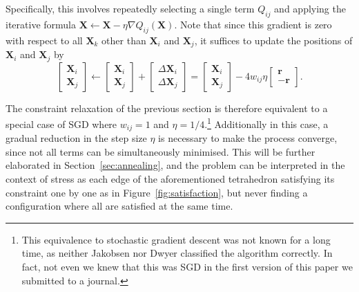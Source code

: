 Specifically, this involves repeatedly selecting a single term $Q_{ij}$ and applying the iterative formula $\mathbf{X}\leftarrow \mathbf{X}-\eta\nabla Q_{ij}(\mathbf{X})$.
Note that since this gradient is zero with respect to all $\mathbf{X}_k$ other than $\mathbf{X}_i$ and $\mathbf{X}_j$, it suffices to update the positions of $\mathbf{X}_i$ and $\mathbf{X}_j$ by
\begin{equation}
  \begin{bmatrix}\mathbf{X}_i\\\mathbf{X}_j\end{bmatrix}
  \leftarrow
  \begin{bmatrix}\mathbf{X}_i\\\mathbf{X}_j\end{bmatrix}+
  \begin{bmatrix}\Delta \mathbf{X}_i\\\Delta \mathbf{X}_j\end{bmatrix}
  =
  \begin{bmatrix}\mathbf{X}_i\\\mathbf{X}_j\end{bmatrix}-
  4w_{ij}\eta
  \begin{bmatrix}\mathbf{r}\\-\mathbf{r}\end{bmatrix}.
  \label{eq:SGD_step}
\end{equation}

The constraint relaxation of the previous section is therefore equivalent to a special case of SGD where $w_{ij}=1$ and $\eta=1/4$.\footnote{This equivalence to stochastic gradient descent was not known for a long time, as neither Jakobsen \cite{Jakobsen2001} nor Dwyer \cite{Dwyer2009} classified the algorithm correctly. In fact, not even we knew that this was SGD in the first version of this paper we submitted to a journal.}
Additionally in this case, a gradual reduction in the step size $\eta$ is necessary to make the process converge, since not all terms can be simultaneously minimised. This will be further elaborated in Section~\ref{sec:annealing}, and the problem can be interpreted in the context of stress as each edge of the aforementioned tetrahedron satisfying its constraint one by one as in Figure~\ref{fig:satisfaction}, but never finding a configuration where all are satisfied at the same time.

